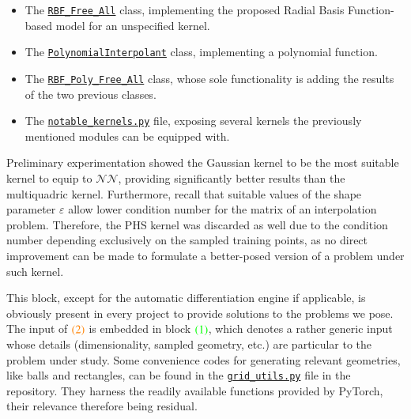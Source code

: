 \documentclass[12pt]{report} %
\newcommand{\tmcolor}[2]{{\color{#1}{#2}}}
\begin{document}
\begin{itemize}
  \item The \href{https://github.com/heqro/tfm-experiments/blob/main/modules/nn_rbf.py}{\texttt{RBF\_Free\_All}} class, implementing the proposed Radial Basis Function-based model for an unspecified kernel.
  \item The \href{https://github.com/heqro/tfm-experiments/blob/main/modules/nn_poly.py}{\texttt{PolynomialInterpolant}} class, implementing a polynomial function.
  \item The \href{https://github.com/heqro/tfm-experiments/blob/main/modules/nn_rbf_poly.py}{\texttt{RBF\_Poly\_Free\_All}} class, whose sole functionality is adding the results of the two previous classes.
  \item The \href{https://github.com/heqro/tfm-experiments/blob/main/modules/notable_kernels.py}{\texttt{notable\_kernels.py}} file, exposing several kernels the previously mentioned modules can be equipped with.
\end{itemize}

Preliminary experimentation showed the Gaussian kernel to be the most suitable kernel to equip to $\mathcal{NN}$, providing significantly better results than the multiquadric kernel. Furthermore, recall that suitable values of the shape parameter $\varepsilon$ allow lower condition number for the matrix of an interpolation problem. Therefore, the PHS kernel was discarded as well due to the condition number depending exclusively on the sampled training points, as no direct improvement can be made to formulate a better-posed version of a problem under such kernel.

This block, except for the automatic differentiation engine if applicable, is obviously present in every project to provide solutions to the problems we pose. The input of  $\tmcolor{orange}{(2)}$ is embedded in block $\tmcolor{green}{(1)}$, which denotes a rather generic input whose details (dimensionality, sampled geometry, etc.) are particular to the problem under study. Some convenience codes for generating relevant geometries, like balls and rectangles, can be found in the \href{https://github.com/heqro/tfm-experiments/blob/main/modules/grid_utils.py}{\texttt{grid\_utils.py}} file in the repository. They harness the readily available functions provided by PyTorch, their relevance therefore being residual.
\end{document}
